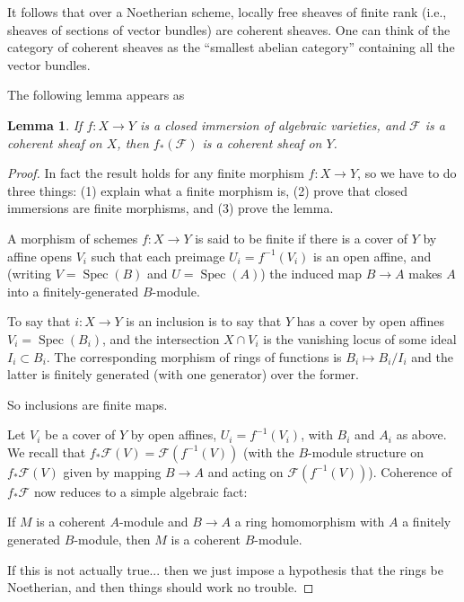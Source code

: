 \documentclass[12pt]{article}
\theoremstyle{plain}
\newtheorem{lemma}[thm]{Lemma}
\theoremstyle{definition}
\numberwithin{equation}{section}
\DeclareMathOperator{\spec}{Spec}
\newcommand{\CF}{\mathcal{F}}
\begin{document}
It follows that over a Noetherian scheme, locally free sheaves of finite rank (i.e., sheaves of sections of vector bundles) are coherent sheaves. One can think of the category of coherent sheaves as the ``smallest abelian category'' containing all the vector bundles.

The following lemma appears as {\cite[II, Exercise 5.5]{Hartshorne}}
\begin{lemma}\label{lem:coherence.pushforward}
If $f : X \rightarrow Y$ is a closed immersion of algebraic varieties, and $\CF$ is a coherent sheaf on $X$, then $f_*(\CF)$ is a coherent sheaf on $Y$.
\end{lemma}


\begin{proof}
In fact the result holds for any finite morphism $f : X \rightarrow Y$, so we have to do three things: (1) explain what a finite morphism is, (2) prove that closed immersions are finite morphisms, and (3) prove the lemma.

A morphism of schemes $f : X \rightarrow Y$ is said to be finite if there is a cover of $Y$ by affine opens $V_i$ such that each preimage $U_i = f^{-1}(V_i)$ is an open affine, and (writing $V = \spec(B)$ and $U = \spec(A)$) the induced map $B \rightarrow A$ makes $A$ into a finitely-generated $B$-module.

To say that $i : X \rightarrow Y$ is an inclusion is to say that $Y$ has a cover by open affines $V_i = \spec(B_i)$, and the intersection $X \cap V_i$ is the vanishing locus of some ideal $I_i \subset B_i$. The corresponding morphism of rings of functions is $B_i \mapsto B_i / I_i$ and the latter is finitely generated (with one generator) over the former.

So inclusions are finite maps.

Let $V_i$ be a cover of $Y$ by open affines, $U_i = f^{-1}(V_i)$, with $B_i$ and $A_i$ as above. We recall that $f_*\CF(V) = \CF(f^{-1}(V))$ (with the $B$-module structure on $f_*\CF(V)$ given by mapping $B \rightarrow A$ and acting on $\CF(f^{-1}(V))$). Coherence of $f_*\CF$ now reduces to a simple algebraic fact:

If $M$ is a coherent $A$-module and $B \rightarrow A$ a ring homomorphism with $A$ a finitely generated $B$-module, then $M$ is a coherent $B$-module.

{\color{red}If this is not actually true... then we just impose a hypothesis that the rings be Noetherian, and then things should work no trouble.}
\end{proof}
\end{document}
